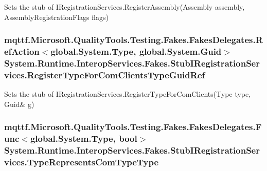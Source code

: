 Sets the stub of I\-Registration\-Services.\-Register\-Assembly(\-Assembly assembly, Assembly\-Registration\-Flags flags)

\hypertarget{class_system_1_1_runtime_1_1_interop_services_1_1_fakes_1_1_stub_i_registration_services_a84c29e5f95541516c9ff9980a2939713}{
\subsubsection[{Register\-Type\-For\-Com\-Clients\-Type\-Guid\-Ref}]{\setlength{\rightskip}{0pt plus 5cm}mqttf.\-Microsoft.\-Quality\-Tools.\-Testing.\-Fakes.\-Fakes\-Delegates.\-Ref\-Action$<$global.\-System.\-Type, global.\-System.\-Guid$>$ System.\-Runtime.\-Interop\-Services.\-Fakes.\-Stub\-I\-Registration\-Services.\-Register\-Type\-For\-Com\-Clients\-Type\-Guid\-Ref}}\label{class_system_1_1_runtime_1_1_interop_services_1_1_fakes_1_1_stub_i_registration_services_a84c29e5f95541516c9ff9980a2939713}


Sets the stub of I\-Registration\-Services.\-Register\-Type\-For\-Com\-Clients(Type type, Guid\& g)

\hypertarget{class_system_1_1_runtime_1_1_interop_services_1_1_fakes_1_1_stub_i_registration_services_a1443a4e4fbb68ca14aa5f364bed24328}{
\subsubsection[{Type\-Represents\-Com\-Type\-Type}]{\setlength{\rightskip}{0pt plus 5cm}mqttf.\-Microsoft.\-Quality\-Tools.\-Testing.\-Fakes.\-Fakes\-Delegates.\-Func$<$global.\-System.\-Type, bool$>$ System.\-Runtime.\-Interop\-Services.\-Fakes.\-Stub\-I\-Registration\-Services.\-Type\-Represents\-Com\-Type\-Type}}\label{class_system_1_1_runtime_1_1_interop_services_1_1_fakes_1_1_stub_i_registration_services_a1443a4e4fbb68ca14aa5f364bed24328}


